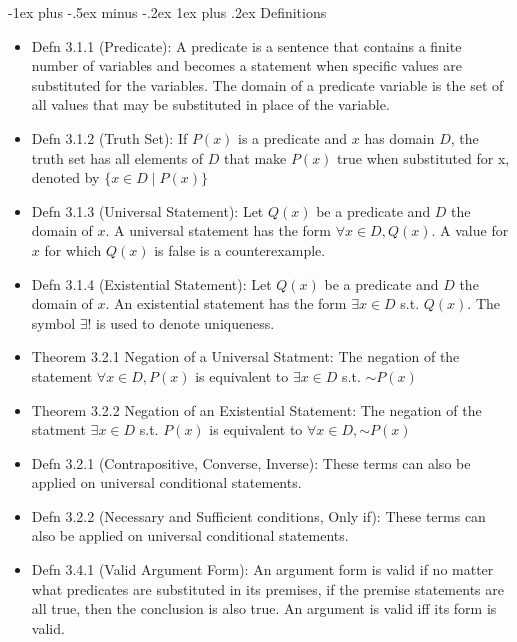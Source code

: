 \documentclass[10pt, portrait]{article}
\makeatletter
\renewcommand{\subsection}{\@startsection{subsection}{3}{0mm}%
                                {-1ex plus -.5ex minus -.2ex}%
                                {1ex plus .2ex}%
                                {\normalfont\small\bfseries}}%
\renewcommand{\lnot}{\mathord{\sim}}
\makeatother
\begin{document}
\begin{multicols*}{2}
\subsection{Definitions}
\begin{itemize}
    \item Defn 3.1.1 (Predicate): A predicate is a sentence that contains a finite number of variables and becomes a statement when specific values are substituted for the variables. The domain of a predicate variable is the set of all values that may be substituted in place of the variable.
    \item Defn 3.1.2 (Truth Set): If $P(x)$ is a predicate and $x$ has domain $D$, the truth set has all elements of $D$ that make $P(x)$ true when substituted for x, denoted by $\{x \in D \mid P(x)\}$
    \item Defn 3.1.3 (Universal Statement): Let $Q(x)$ be a predicate and $D$ the domain of $x$. A universal statement has the form $\forall x \in D, Q(x)$. A value for $x$ for which $Q(x)$ is false is a counterexample.
    \item Defn 3.1.4 (Existential Statement): Let $Q(x)$ be a predicate and $D$ the domain of $x$. An existential statement has the form $\exists x \in D$ s.t. $Q(x)$. The symbol $\exists !$ is used to denote uniqueness.
    \item Theorem 3.2.1 Negation of a Universal Statment: The negation of the statement $\forall x \in D, P(x)$ is equivalent to $\exists x \in D$  s.t. $\lnot P(x)$
    \item Theorem 3.2.2 Negation of an Existential Statement: The negation of the statment $\exists x \in D$ s.t. $P(x)$ is equivalent to $\forall x \in D, \lnot P(x)$
    \item Defn 3.2.1 (Contrapositive, Converse, Inverse): These terms can also be applied on universal conditional statements.
    \item Defn 3.2.2 (Necessary and Sufficient conditions, Only if): These terms can also be applied on universal conditional statements.
    \item Defn 3.4.1 (Valid Argument Form): An argument form is valid if no matter what predicates are substituted in its premises, if the premise statements are all true, then the conclusion is also true. An argument is valid iff its form is valid.
\end{itemize}


\end{multicols*}
\end{document}
